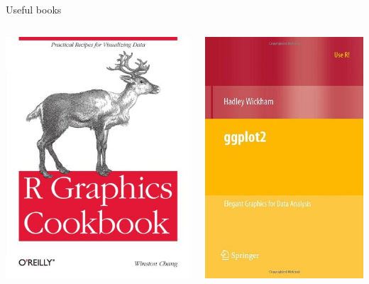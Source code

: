 \documentclass{beamer}\usepackage[]{graphicx}\usepackage[]{color}
\begin{document}
\begin{frame}{Useful books}
\begin{columns}
\begin{column}{0.5\textwidth}
\includegraphics[scale=0.45]{rgraphicscookbook}
\end{column}

\begin{column}{0.5\textwidth}
\includegraphics[scale=0.45]{ggplot2}
\end{column}
\end{columns}
\end{frame}
\end{document}
